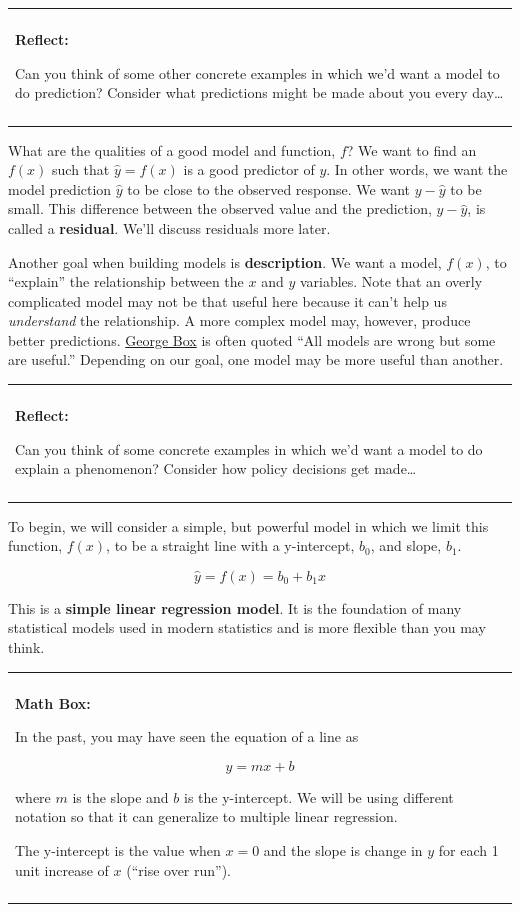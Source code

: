 \documentclass[]{book}
\newenvironment{reflect}
{
    \begin{center}
    
    \begin{tabular}{|p{0.8\textwidth}|}
    \rowcolor{LightBlue}
    \hline\\
    \rowcolor{LightBlue}
    \textbf{Reflect:}
}
{
    \\\rowcolor{LightBlue}
    \\\hline
    \end{tabular} 
    \end{center}
}
\newenvironment{mathbox}
{
    \begin{center}
    
    \begin{tabular}{|p{0.8\textwidth}|}
    \rowcolor{LightYellow}
    \hline\\
    \rowcolor{LightYellow}
    \textbf{Math Box:}
}
{
    \\\rowcolor{LightYellow}
    \\\hline
    \end{tabular} 
    \end{center}
}
\begin{document}
\begin{reflect}
Can you think of some other concrete examples in which we'd want a model
to do prediction? Consider what predictions might be made about you
every day\ldots{}
\end{reflect}

What are the qualities of a good model and function, \(f\)? We want to find an \(f(x)\) such that \(\hat{y} = f(x)\) is a good predictor of \(y\). In other words, we want the model prediction \(\hat{y}\) to be close to the observed response. We want \(y-\hat{y}\) to be small. This difference between the observed value and the prediction, \(y-\hat{y}\), is called a \textbf{residual}. We'll discuss residuals more later.

Another goal when building models is \textbf{description}. We want a model, \(f(x)\), to ``explain'' the relationship between the \(x\) and \(y\) variables. Note that an overly complicated model may not be that useful here because it can't help us \emph{understand} the relationship. A more complex model may, however, produce better predictions. \href{https://en.wikipedia.org/wiki/George_E._P._Box}{George Box} is often quoted ``All models are wrong but some are useful.'' Depending on our goal, one model may be more useful than another.

\begin{reflect}
Can you think of some concrete examples in which we'd want a model to do
explain a phenomenon? Consider how policy decisions get made\ldots{}
\end{reflect}

To begin, we will consider a simple, but powerful model in which we limit this function, \(f(x)\), to be a straight line with a y-intercept, \(b_0\), and slope, \(b_1\).

\[\hat{y} = f(x) = b_0 + b_1x\]

This is a \textbf{simple linear regression model}. It is the foundation of many statistical models used in modern statistics and is more flexible than you may think.

\begin{mathbox}
In the past, you may have seen the equation of a line as

\[y = mx + b\]

where \(m\) is the slope and \(b\) is the y-intercept. We will be using
different notation so that it can generalize to multiple linear
regression.

The y-intercept is the value when \(x=0\) and the slope is change in
\(y\) for each 1 unit increase of \(x\) (``rise over run'').
\end{mathbox}
\end{document}
